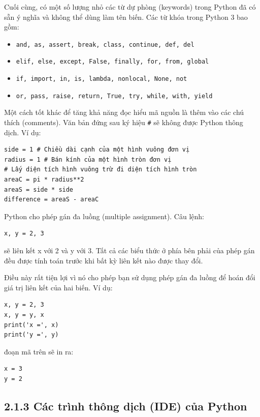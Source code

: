 Cuối cùng, có một số lượng nhỏ các từ dự phòng (keywords) trong Python đã có sẵn ý nghĩa và không thể dùng làm tên biến. Các từ khóa trong Python 3 bao gồm:

\begin{itemize}
    \item \texttt{and, as, assert, break, class, continue, def, del}
    \item \texttt{elif, else, except, False, finally, for, from, global}
    \item \texttt{if, import, in, is, lambda, nonlocal, None, not}
    \item \texttt{or, pass, raise, return, True, try, while, with, yield}
\end{itemize}

Một cách tốt khác để tăng khả năng đọc hiểu mã nguồn là thêm vào các chú thích (comments). Văn bản đứng sau ký hiệu \texttt{\#} sẽ không được Python thông dịch. Ví dụ:

\begin{verbatim}
side = 1 # Chiều dài cạnh của một hình vuông đơn vị
radius = 1 # Bán kính của một hình tròn đơn vị
# Lấy diện tích hình vuông trừ đi diện tích hình tròn
areaC = pi * radius**2 
areaS = side * side 
difference = areaS - areaC
\end{verbatim}

Python cho phép gán đa luồng (multiple assignment). Câu lệnh:

\begin{verbatim}
x, y = 2, 3
\end{verbatim}

sẽ liên kết x với 2 và y với 3. Tất cả các biểu thức ở phía bên phải của phép gán đều được tính toán trước khi bất kỳ liên kết nào được thay đổi.

Điều này rất tiện lợi vì nó cho phép bạn sử dụng phép gán đa luồng để hoán đổi giá trị liên kết của hai biến. Ví dụ:

\begin{verbatim}
x, y = 2, 3 
x, y = y, x 
print('x =', x) 
print('y =', y)
\end{verbatim}

đoạn mã trên sẽ in ra:

\begin{verbatim}
x = 3 
y = 2
\end{verbatim}

\subsection*{2.1.3 Các trình thông dịch (IDE) của Python}

